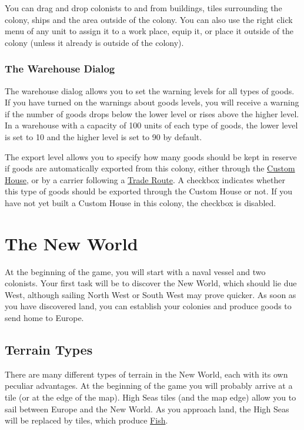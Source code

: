 \documentclass[12pt]{book}
\begin{document}
You can drag and drop colonists to and from buildings, tiles
surrounding the colony, ships and the area outside of the colony. You
can also use the right click menu of any unit to assign it to a work
place, equip it, or place it outside of the colony (unless it already
is outside of the colony).



\hypertarget{The Warehouse Dialog}{\subsection{The Warehouse Dialog}}

The warehouse dialog allows you to set the warning levels for all
types of goods. If you have turned on the warnings about goods levels,
you will receive a warning if the number of goods drops below the
lower level or rises above the higher level. In a warehouse with a
capacity of 100 units of each type of goods, the lower level is set to
10 and the higher level is set to 90 by default.

The export level allows you to specify how many goods should be kept
in reserve if goods are automatically exported from this colony,
either through the \hyperlink{Custom House}{Custom House}, or by a
carrier following a \hyperlink{Trade Routes}{Trade Route}. A checkbox
indicates whether this type of goods should be exported through the
Custom House or not. If you have not yet built a Custom House in this
colony, the checkbox is disabled.


\hypertarget{The New World}{\chapter{The New World}}

At the beginning of the game, you will start with a naval vessel and
two colonists. Your first task will be to discover the New World,
which should lie due West, although sailing North West or South West
may prove quicker. As soon as you have discovered land, you can
establish your colonies and produce goods to send home to Europe.

\hypertarget{Terrain Types}{\section{Terrain Types}}

There are many different types of terrain in the New World, each with
its own peculiar advantages. At the beginning of the game you will
probably arrive at a  tile (or at the edge of the
map). High Seas tiles (and the map edge) allow you to sail between
Europe and the New World. As you approach land, the High Seas will be
replaced by  tiles, which produce
\hyperlink{Fish}{Fish}.
\end{document}
